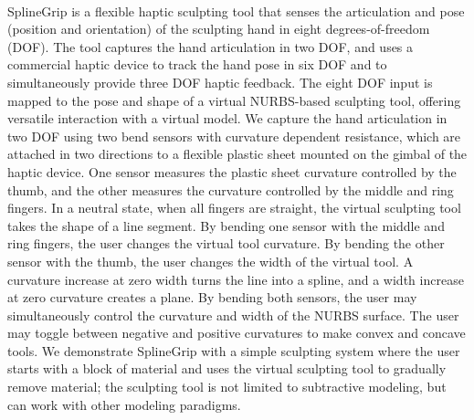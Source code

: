 {{{\begin{enumerate}
\\ \aabstract
SplineGrip is a flexible haptic sculpting tool that senses the articulation and pose (position and orientation) of the sculpting hand in eight degrees-of-freedom (DOF). The tool captures the hand articulation in two DOF, and uses a commercial haptic device to track the hand pose in six DOF and to simultaneously provide three DOF haptic feedback. The eight DOF input is mapped to the pose and shape of a virtual NURBS-based sculpting tool, offering versatile interaction with a virtual model. We capture the hand articulation in two DOF using two bend sensors with curvature dependent resistance, which are attached in two directions to a flexible plastic sheet mounted on the gimbal of the haptic device. One sensor measures the plastic sheet curvature controlled by the thumb, and the other measures the curvature controlled by the middle and ring fingers. In a neutral state, when all fingers are straight, the virtual sculpting tool takes the shape of a line segment. By bending one sensor with the middle and ring fingers, the user changes the virtual tool curvature. By bending the other sensor with the thumb, the user changes the width of the virtual tool. A curvature increase at zero width turns the line into a spline, and a width increase at zero curvature creates a plane. By bending both sensors, the user may simultaneously control the curvature and width of the NURBS surface. The user may toggle between negative and positive curvatures to make convex and concave tools. We demonstrate SplineGrip with a simple sculpting system where the user starts with a block of material and uses the virtual sculpting tool to gradually remove material; the sculpting tool is not limited to subtractive modeling, but can work with other modeling paradigms.



\end{enumerate}}}}
